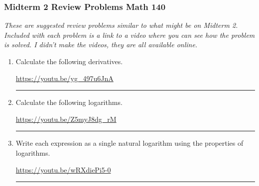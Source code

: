 \documentclass[12pt]{article}
\newcommand{\ds}{\displaystyle}
\begin{document}
\pagestyle{empty}
\subsubsection*{Midterm 2 Review Problems \hfill Math 140 }
\textit{These are suggested review problems similar to what might be on Midterm 2. Included with each problem is a link to a video where you can see how the problem is solved. I didn't make the videos, they are all  available online.}

\begin{enumerate}

%
%

\item Calculate the following derivatives.
\begin{enumerate}
\end{enumerate}
\vfill
\hfill \url{https://youtu.be/yg_497u6JnA}
\hrule

\item Calculate the following logarithms.
\begin{enumerate}
\end{enumerate}
\vfill
\hfill \url{https://youtu.be/Z5myJ8dg_rM}
\hrule

\item Write each expression as a single natural logarithm using the properties of logarithms. 
\begin{enumerate}
\end{enumerate}
\vfill
\hfill \url{https://youtu.be/wRXdiePi5-0}
\hrule



\end{enumerate}
\end{document}
